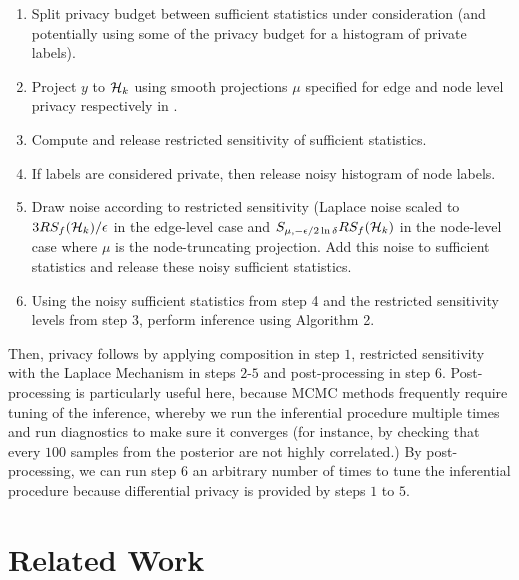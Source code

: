 \begin{enumerate}
	\item Split privacy budget between sufficient statistics under consideration (and potentially using some of the privacy budget for a histogram of private labels).
	\item Project $y$ to $\mathcal{H}_k$ using smooth projections $\mu$ specified for edge and node level privacy respectively in .
	\item Compute and release restricted sensitivity of sufficient statistics.
	\item If labels are considered private, then release noisy histogram of node labels.
	\item Draw noise according to restricted sensitivity (Laplace noise scaled to $3RS_f(\mathcal{H}_k)/\epsilon$ in the edge-level case and $S_{\mu, -\epsilon/2\ln\delta} RS_f(\mathcal{H}_k)$ in the node-level case where $\mu$ is the node-truncating projection. Add this noise to sufficient statistics and release these noisy sufficient statistics.
	\item Using the noisy sufficient statistics from step 4 and the restricted sensitivity levels from step 3, perform inference using Algorithm 2. 
\end{enumerate}

Then, privacy follows by applying composition in step $1$, restricted sensitivity with the Laplace Mechanism in steps $2$-$5$ and post-processing in step $6$. Post-processing is particularly useful here, because MCMC methods frequently require tuning of the inference, whereby we run the inferential procedure multiple times and run diagnostics to make sure it converges (for instance, by checking that every $100$ samples from the posterior are not highly correlated.) By post-processing, we can run step $6$ an arbitrary number of times to tune the inferential procedure because differential privacy is provided by steps $1$ to $5$.

\section{Related Work}\label{sec:rel_work}

